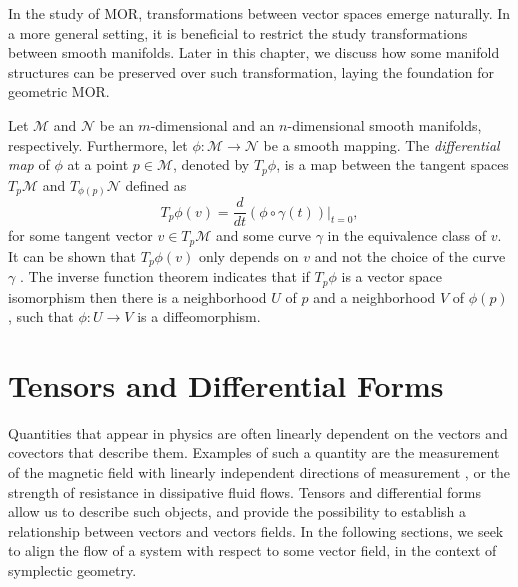 In the study of MOR, transformations between vector spaces emerge naturally. In a more general setting, it is beneficial to restrict the study transformations between smooth manifolds. Later in this chapter, we discuss how some manifold structures can be preserved over such transformation, laying the foundation for geometric MOR.

Let $\mathcal M$ and $\mathcal N$ be an $m$-dimensional and an $n$-dimensional smooth manifolds, respectively. Furthermore, let $\phi:\mathcal M\to \mathcal N$ be a smooth mapping. The \emph{differential map} of $\phi$ at a point $p\in \mathcal M$, denoted by $T_{p}\phi$, is a map between the tangent spaces $T_p \mathcal M$ and $T_{\phi(p)} \mathcal N$ defined as
\begin{equation} \label{eq:2.4}
	T_p \phi(v) = \frac{d}{dt}(\phi\circ \gamma(t))|_{t=0},
\end{equation}
for some tangent vector $v\in T_{p} \mathcal M$ and some curve $\gamma$ in the equivalence class of $v$. It can be shown that $T_p \phi(v)$ only depends on $v$ and not the choice of the curve $\gamma$ \cite{robbin2011introduction}. The inverse function theorem \cite{rudin1976principles} indicates that if $T_p\phi$ is a vector space isomorphism then there is a neighborhood $U$ of $p$ and a neighborhood $V$ of $\phi(p)$, such that $\phi:U\to V$ is a diffeomorphism.

\section{Tensors and Differential Forms} \label{section:2.2}
Quantities that appear in physics are often linearly dependent on the vectors and covectors that describe them. Examples of such a quantity are the measurement of the magnetic field with linearly independent directions of measurement \cite{Wald:106274}, or the strength of resistance in dissipative fluid flows. Tensors and differential forms allow us to describe such objects, and provide the possibility to establish a relationship between vectors and vectors fields. In the following sections, we seek to align the flow of a system with respect to some vector field, in the context of symplectic geometry. 



